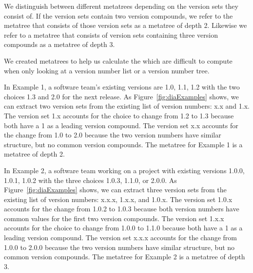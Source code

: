 \documentclass[conference]{IEEEtran}
\begin{document}

We distinguish between different metatrees depending on the version sets they consist of. If the version sets contain two version compounds, we refer to the metatree that consists of those version sets as a metatree of depth 2. 
Likewise we refer to a metatree that consists of version sets containing three version compounds as a metatree of depth 3.


We  created metatrees to help us calculate the \numberchoices which are difficult to compute when only looking at a version number list or a version number tree.

In Example 1, a software team's existing versions are 1.0, 1.1, 1.2 with the two choices 1.3 and 2.0 for the next release. As Figure~\ref{fig:diaExamples} shows, we can extract two version sets from the existing list of version numbers: x.x and 1.x. The version set 1.x accounts for the choice to change from 1.2 to 1.3 because both have a 1 as a leading version compound. The version set x.x accounts for the change from 1.0 to 2.0 because the two version numbers have similar structure, but no common version compounds.
The metatree for Example 1 is a metatree of depth 2.


In Example 2, a software team working on a project with existing versions 1.0.0, 1.0.1, 1.0.2 with the three choices 1.0.3, 1.1.0, or 2.0.0. 
As Figure~\ref{fig:diaExamples} shows, we can extract three version sets from the existing list of version numbers: x.x.x, 1.x.x, and 1.0.x. 
The version set 1.0.x accounts for the change from 1.0.2 to 1.0.3 because both version numbers have common values for the first two version compounds. 
The version set 1.x.x accounts for the choice to change from 1.0.0 to 1.1.0 because both have a 1 as a leading version compound. 
The version set x.x.x accounts for the change from 1.0.0 to 2.0.0 because the two version numbers have similar structure, but no common version compounds.
The metatree for Example 2 is a metatree of depth 3.
\end{document}
